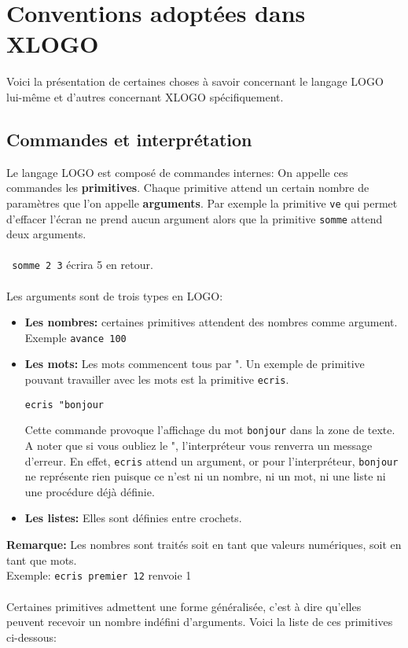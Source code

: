 \chapter{Conventions adoptées dans XLOGO}
Voici la présentation de certaines choses à savoir concernant le langage LOGO lui-même et d'autres concernant XLOGO spécifiquement.

\section{Commandes et interprétation}
Le langage LOGO est composé de commandes internes: On appelle ces commandes les \textbf{primitives}. Chaque primitive attend un certain nombre de paramètres que l'on appelle \textbf{arguments}. Par exemple la primitive \texttt{ve} qui permet d'effacer l'écran ne prend aucun argument alors que la primitive \texttt{somme} attend deux arguments.\\
\\
\texttt{ somme 2 3} écrira 5 en retour.\\
\\
Les arguments sont de trois types en LOGO:
\begin{itemize}
\item \textbf{Les nombres:}  certaines primitives attendent des nombres comme argument. Exemple \texttt{avance 100}
\item \textbf{Les mots:}  Les mots commencent tous par ". Un exemple de primitive pouvant travailler avec les mots est la primitive \texttt{ecris}. 
\begin{center}
\texttt{ecris "bonjour} 
\end{center}
Cette commande provoque l'affichage du mot \texttt{bonjour} dans la zone de texte.\\
 A noter que si vous oubliez le ", l'interpréteur vous renverra un message d'erreur. En effet, \texttt{ecris} attend un argument, or pour l'interpréteur, \texttt{bonjour} ne représente rien puisque ce n'est ni un nombre, ni un mot, ni une liste ni une procédure déjà définie.
\item\textbf{Les listes:} Elles sont définies entre crochets.
\end{itemize}
\vspace{0.5cm}
\textbf{Remarque:} Les nombres sont traités soit en tant que valeurs numériques, soit en tant que mots.\\
Exemple: \texttt{ecris premier 12} renvoie 1\\ \\
Certaines primitives admettent une forme généralisée, c'est à dire qu'elles peuvent recevoir un nombre indéfini d'arguments. Voici la liste de ces primitives ci-dessous:
